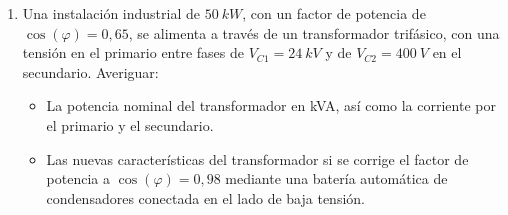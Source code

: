 \documentclass[../main]{subfiles}
\begin{document}
\begin{enumerate}
    \begin{itemize}
      \item El $\cos(\varphi)$ medio en dicho período de facturación.
      \item Las intensidades $I_C$ e $I_S$.
      \item La potencia reactiva de un banco de condensadores
        necesaria para corregir el factor de potencia a
        $\cos(\varphi)=0{,}93$.
      \item El porcentaje de reducción de la corriente simple $I_S$
        una vez conectado el banco de condensadores.
    \end{itemize}
  \item Una instalación industrial de $\qty{50}{kW}$, con un factor
    de potencia de $\cos(\varphi)=0{,}65$, se alimenta a través de un
    transformador trifásico, con una tensión en el primario entre
    fases de $V_{C1}=\qty{24}{kV}$ y de $V_{C2}=\qty{400}{V}$ en el
    secundario. Averiguar:
    \begin{itemize}
      \item La potencia nominal del transformador en kVA, así como la
        corriente por el primario y el secundario.
      \item Las nuevas características del transformador si se
        corrige el factor de potencia a $\cos(\varphi)=0{,}98$
        mediante una batería automática de condensadores conectada en
        el lado de baja tensión.
    \end{itemize}
\end{enumerate}
\end{document}
